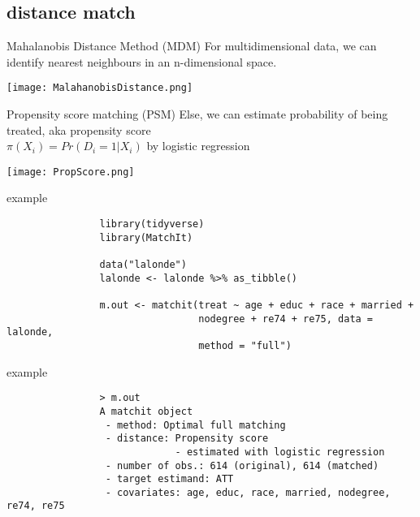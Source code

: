 \documentclass[aspectratio=169]{beamer}
\begin{document}
	\subsection{distance match}
		\begin{frame}{Mahalanobis Distance Method (MDM)}
			For multidimensional data, we can identify nearest neighbours in an n-dimensional space.
			\begin{center}
				\texttt{[image: MalahanobisDistance.png]}
			\end{center}
		\end{frame}

		\begin{frame}{Propensity score matching (PSM)}
			Else, we can estimate probability of being treated, aka propensity score \\
			 $\pi(X_i) = Pr(D_i = 1 | X_i)$ by logistic regression
			\begin{center}
				\texttt{[image: PropScore.png]}
			\end{center}
		\end{frame}

		\begin{frame}[fragile]{example}
				\begin{verbatim}
				library(tidyverse)
				library(MatchIt)

				data("lalonde")
				lalonde <- lalonde %>% as_tibble()

				m.out <- matchit(treat ~ age + educ + race + married +
				                 nodegree + re74 + re75, data = lalonde,
				                 method = "full")
			\end{verbatim}
		\end{frame}

		\begin{frame}[fragile]{example}
			\begin{verbatim}
				> m.out
				A matchit object
				 - method: Optimal full matching
				 - distance: Propensity score
				             - estimated with logistic regression
				 - number of obs.: 614 (original), 614 (matched)
				 - target estimand: ATT
				 - covariates: age, educ, race, married, nodegree, re74, re75
 	 		\end{verbatim}
		\end{frame}
\end{document}

